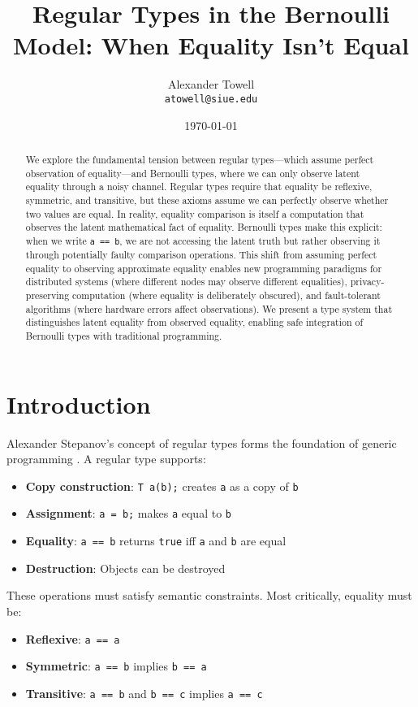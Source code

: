 \documentclass[11pt,final,hidelinks]{article}
\title{Regular Types in the Bernoulli Model: When Equality Isn't Equal}
\author{
    Alexander Towell\\
    \texttt{atowell@siue.edu}
}
\date{\today}
\newcommand{\code}[1]{\texttt{#1}}
\begin{document}
\maketitle

\begin{abstract}
We explore the fundamental tension between regular types—which assume perfect observation of equality—and Bernoulli types, where we can only observe latent equality through a noisy channel. Regular types require that equality be reflexive, symmetric, and transitive, but these axioms assume we can perfectly observe whether two values are equal. In reality, equality comparison is itself a computation that observes the latent mathematical fact of equality. Bernoulli types make this explicit: when we write \code{a == b}, we are not accessing the latent truth but rather observing it through potentially faulty comparison operations. This shift from assuming perfect equality to observing approximate equality enables new programming paradigms for distributed systems (where different nodes may observe different equalities), privacy-preserving computation (where equality is deliberately obscured), and fault-tolerant algorithms (where hardware errors affect observations). We present a type system that distinguishes latent equality from observed equality, enabling safe integration of Bernoulli types with traditional programming.
\end{abstract}

\section{Introduction}

Alexander Stepanov's concept of regular types forms the foundation of generic programming \cite{stepanov2014}. A regular type supports:
\begin{itemize}
    \item \textbf{Copy construction}: \code{T a(b);} creates \code{a} as a copy of \code{b}
    \item \textbf{Assignment}: \code{a = b;} makes \code{a} equal to \code{b}
    \item \textbf{Equality}: \code{a == b} returns \code{true} iff \code{a} and \code{b} are equal
    \item \textbf{Destruction}: Objects can be destroyed
\end{itemize}

These operations must satisfy semantic constraints. Most critically, equality must be:
\begin{itemize}
    \item \textbf{Reflexive}: \code{a == a}
    \item \textbf{Symmetric}: \code{a == b} implies \code{b == a}
    \item \textbf{Transitive}: \code{a == b} and \code{b == c} implies \code{a == c}
\end{itemize}
\end{document}
